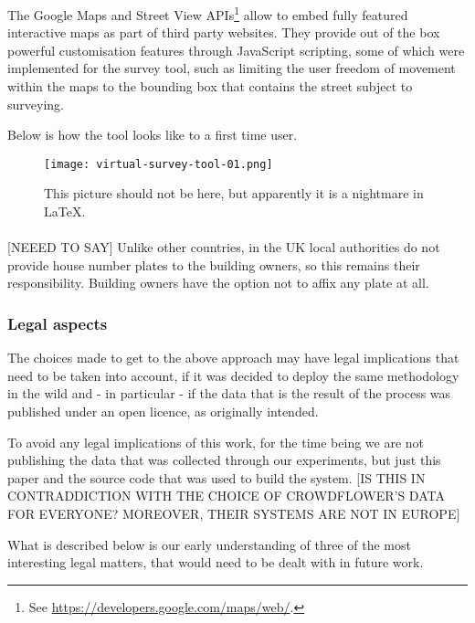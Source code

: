 {        The Google Maps and Street View APIs\footnote{See \url{https://developers.google.com/maps/web/}.} allow to embed fully featured interactive maps as part of third party websites. They provide out of the box powerful customisation features through JavaScript scripting, some of which were implemented for the survey tool, such as limiting the user freedom of movement within the maps to the bounding box that contains the street subject to surveying.   
        
        Below is how the tool looks like to a first time user.
    
        \begin{figure*}
        	\texttt{[image: virtual-survey-tool-01.png]}
        	\caption{This picture should not be here, but apparently it is a nightmare in LaTeX.}
        	\label{fig:some_figure}
        \end{figure*}
        
        \paragraph{}
        
        [NEEED TO SAY] Unlike other countries, in the UK local authorities do not provide house number plates to the building owners, so this remains their responsibility. Building owners have the option not to affix any plate at all.

    \subsubsection{Legal aspects}

    The choices made to get to the above approach may have legal implications that need to be taken into account, if it was decided to deploy the same methodology in the wild and - in particular - if the data that is the result of the process was published under an open licence, as originally intended. 
    
    To avoid any legal implications of this work, for the time being we are not publishing the data that was collected through our experiments, but just this paper and the source code that was used to build the system. [IS THIS IN CONTRADDICTION WITH THE CHOICE OF CROWDFLOWER'S DATA FOR EVERYONE? MOREOVER, THEIR SYSTEMS ARE NOT IN EUROPE]
    
    What is described below is our early understanding of three of the most interesting legal matters, that would need to be dealt with in future work. 

}

